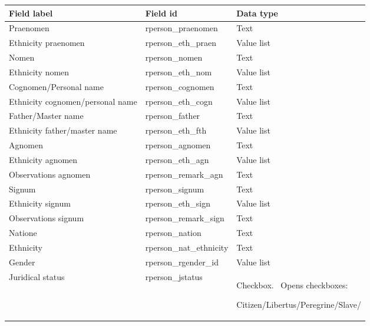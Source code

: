 \documentclass[amsthm,ebook]{saparticle}
\begin{document}
\begin{center}
\tablefirsthead{}
\tablehead{}
\tabletail{}
\tablelasttail{}
\begin{supertabular}{|m{3.711cm}|m{2.941cm}|m{4.046cm}|}
\hline
Field label &
Field id &
Data type\\\hline
Praenomen &
rperson\_praenomen &
Text\\\hline
Ethnicity praenomen &
rperson\_eth\_praen &
Value list\\\hline
Nomen &
rperson\_nomen &
Text\\\hline
Ethnicity nomen &
rperson\_eth\_nom &
Value list\\\hline
Cognomen/Personal name &
rperson\_cognomen &
Text\\\hline
Ethnicity cognomen/personal name &
rperson\_eth\_cogn &
Value list\\\hline
Father/Master name &
rperson\_father &
Text\\\hline
Ethnicity father/master name &
rperson\_eth\_fth &
Value list\\\hline
Agnomen &
rperson\_agnomen &
Text\\\hline
Ethnicity agnomen &
rperson\_eth\_agn &
Value list\\\hline
Observations agnomen &
rperson\_remark\_agn &
Text\\\hline
Signum &
rperson\_signum &
Text\\\hline
Ethnicity signum &
rperson\_eth\_sign &
Value list\\\hline
Observations signum &
rperson\_remark\_sign &
Text\\\hline
Natione &
rperson\_nation &
Text\\\hline
Ethnicity &
rperson\_nat\_ethnicity &
Text\\\hline
Gender &
rperson\_rgender\_id &
Value list\\\hline
Juridical status &
rperson\_jstatus &
Checkbox. \ Opens checkboxes: 

Citizen/Libertus/Peregrine/Slave/


\end{supertabular}
\end{center}
\end{document}
